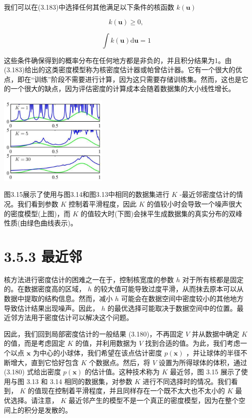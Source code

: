 \documentclass[10pt]{report}
\begin{document}
我们可以在(3.183)中选择任何其他满足以下条件的核函数 \(k\left( \mathbf{u}\right)\)

\[
k\left( \mathbf{u}\right)  \geq  0, \tag{3.185}
\]

\[
\int k\left( \mathbf{u}\right) \mathrm{d}\mathbf{u} = 1 \tag{3.186}
\]

这些条件确保得到的概率分布在任何地方都是非负的，并且积分结果为1。由(3.183)给出的这类密度模型称为核密度估计器或帕曾估计器。它有一个很大的优点，即在“训练”阶段不需要进行计算，因为这只需要存储训练集。然而，这也是它的一个很大的缺点，因为评估密度的计算成本会随着数据集的大小线性增长。

\begin{center}
\includegraphics[max width=0.4\textwidth]{images/0194e279-9b28-703a-88f4-c3ac21e2010d_122_940_369_552_454_0.jpg}
\end{center}
\hspace*{3em} 

图3.15展示了使用与图3.14和图3.13中相同的数据集进行 \(K\) -最近邻密度估计的情况。我们看到参数 \(K\) 控制着平滑程度，因此 \(K\) 的值较小时会导致一个噪声很大的密度模型(上图)，而 \(K\) 的值较大时(下图)会抹平生成数据集的真实分布的双峰性质(由绿色曲线表示)。

\section*{3.5.3 最近邻}

核方法进行密度估计的困难之一在于，控制核宽度的参数 \(h\) 对于所有核都是固定的。在数据密度高的区域， \(h\) 的较大值可能导致过度平滑，从而抹去原本可以从数据中提取的结构信息。然而，减小 \(h\) 可能会在数据空间中密度较小的其他地方导致估计结果出现噪声。因此， \(h\) 的最优选择可能取决于数据空间中的位置。最近邻方法用于密度估计可以解决这个问题。

因此，我们回到局部密度估计的一般结果 (3.180)，不再固定 \(V\) 并从数据中确定 \(K\) 的值，而是考虑固定 \(K\) 的值，并利用数据为 \(V\) 找到合适的值。为此，我们考虑一个以点 \(\mathbf{x}\) 为中心的小球体，我们希望在该点估计密度 \(p\left( \mathbf{x}\right)\) ，并让球体的半径不断增大，直到它恰好包含 \(K\) 个数据点。然后，将 \(V\) 设置为所得球体的体积，通过 (3.180) 式给出密度 \(p\left( \mathbf{x}\right)\) 的估计值。这种技术称为 \(K\) 最近邻，图 3.15 展示了使用与图 3.13 和 3.14 相同的数据集，对参数 \(K\) 进行不同选择时的情况。我们看到， \(K\) 的值现在控制着平滑程度，并且同样存在一个既不太大也不太小的 \(K\) 最优选择。请注意， \(K\) 最近邻产生的模型不是一个真正的密度模型，因为在整个空间上的积分是发散的。
\end{document}
